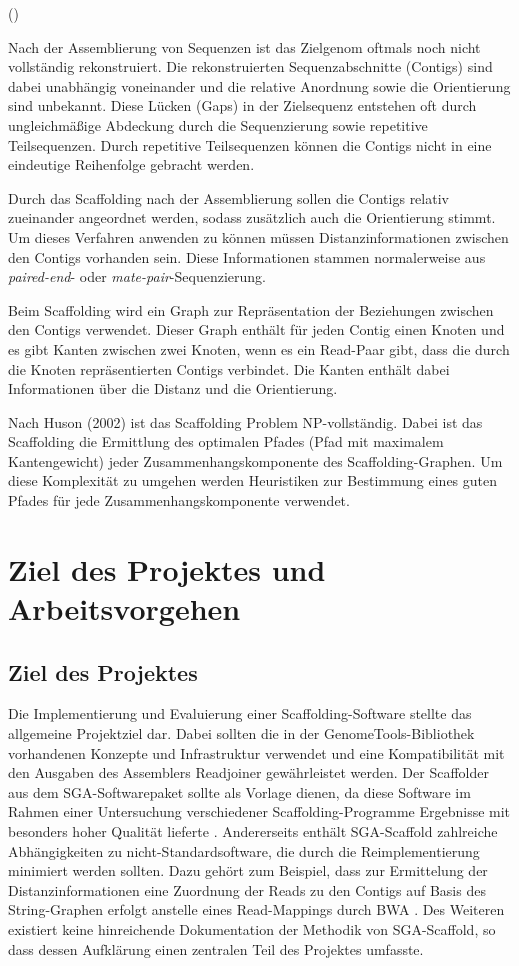 \documentclass[a4paper,10pt,parskip]{scrartcl}
\begin{document}
()

Nach der Assemblierung von Sequenzen ist das Zielgenom oftmals noch
nicht vollständig rekonstruiert. Die rekonstruierten Sequenzabschnitte
(Contigs) sind dabei unabhängig voneinander und die relative Anordnung
sowie die Orientierung sind unbekannt. Diese Lücken (Gaps) in der
Zielsequenz entstehen oft durch ungleichmäßige Abdeckung durch die
Sequenzierung sowie repetitive Teilsequenzen. Durch repetitive
Teilsequenzen können die Contigs nicht in eine eindeutige Reihenfolge
gebracht werden.

Durch das Scaffolding nach der Assemblierung sollen die Contigs
relativ zueinander angeordnet werden, sodass zusätzlich auch die
Orientierung stimmt. Um dieses Verfahren anwenden zu können müssen
Distanzinformationen zwischen den Contigs vorhanden sein. Diese
Informationen stammen normalerweise aus \textit{paired-end}- oder
\textit{mate-pair}-Sequenzierung.

Beim Scaffolding wird ein Graph zur Repräsentation der Beziehungen
zwischen den Contigs verwendet. Dieser Graph enthält für jeden Contig
einen Knoten und es gibt Kanten zwischen zwei Knoten, wenn es ein
Read-Paar gibt, dass die durch die Knoten repräsentierten Contigs
verbindet. Die Kanten enthält dabei Informationen über die Distanz und
die Orientierung.

Nach Huson (2002) \cite{Huson:2002kf} ist das Scaffolding Problem
NP-vollständig. Dabei ist das Scaffolding die Ermittlung des optimalen
Pfades (Pfad mit maximalem Kantengewicht) jeder
Zusammenhangskomponente des Scaffolding-Graphen. Um diese Komplexität
zu umgehen werden Heuristiken zur Bestimmung eines guten Pfades für
jede Zusammenhangskomponente verwendet.

\section{Ziel des Projektes und Arbeitsvorgehen}
\subsection{Ziel des Projektes}
Die Implementierung und Evaluierung einer Scaffolding-Software stellte
das allgemeine Projektziel dar. Dabei sollten die in der
GenomeTools-Bibliothek \cite{Gremme:2013} vorhandenen Konzepte und
Infrastruktur verwendet und eine Kompatibilität mit den Ausgaben des
Assemblers Readjoiner \cite{Gonnella:2012gn} gewährleistet werden. Der
Scaffolder aus dem SGA-Softwarepaket \cite{Simpson:2012ef} sollte als
Vorlage dienen, da diese Software im Rahmen einer Untersuchung
verschiedener Scaffolding-Programme Ergebnisse mit besonders hoher
Qualität lieferte \cite{Hunt:2014dh}. Andererseits enthält
SGA-Scaffold zahlreiche Abhängigkeiten zu nicht-Standardsoftware, die
durch die Reimplementierung minimiert werden sollten. Dazu gehört zum
Beispiel, dass zur Ermittelung der Distanzinformationen eine Zuordnung
der Reads zu den Contigs auf Basis des String-Graphen erfolgt anstelle
eines Read-Mappings durch BWA \cite{Li:2009}. Des Weiteren existiert
keine hinreichende Dokumentation der Methodik von SGA-Scaffold, so
dass dessen Aufklärung einen zentralen Teil des Projektes umfasste.
\end{document}
